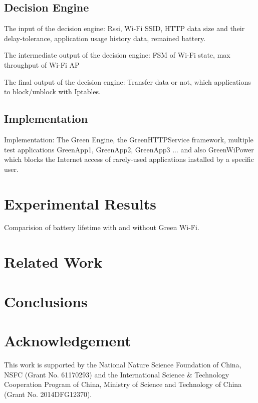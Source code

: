 \documentclass[journal]{IEEEtran}
\begin{document}
\subsection{Decision Engine}
The input of the decision engine: Rssi, Wi-Fi SSID, HTTP data size and their delay-tolerance, application usage history data, 
remained battery.

The intermediate output of the decision engine: FSM of Wi-Fi state, max throughput of Wi-Fi AP

The final output of the decision engine: Transfer data or not, which applications to block/unblock with Iptables.
%
%
\subsection{Implementation}
Implementation: The Green Engine, the GreenHTTPService framework, multiple test applications GreenApp1, GreenApp2, GreenApp3 ... and also GreenWiPower which blocks the Internet access of rarely-used applications installed by a specific user.

\section{Experimental Results}
Comparision of battery lifetime with and without Green Wi-Fi.

\section{Related Work}
\section{Conclusions} 
\section*{Acknowledgement}

This work is supported by the National Nature Science Foundation of China, NSFC (Grant No. 61170293) 
and the International Science \& Technology Cooperation Program of China, 
Ministry of Science and Technology of China (Grant No. 2014DFG12370).

\ifCLASSOPTIONcaptionsoff
  \newpage
\fi
{}
\end{document}
